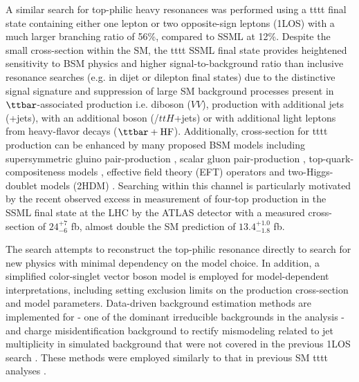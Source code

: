 \documentclass[../thesis.tex]{subfiles}
\begin{document}
A similar search for top-philic heavy resonances was performed using a \acs{tttt} final state containing either one lepton or two opposite-sign leptons (\acs{1LOS}) \citep{theory:ttZp_1los} with a much larger branching ratio of 56\%, compared to \acs{SSML} at 12\%. Despite the small cross-section within the \acs{SM}, the \acs{tttt} \acs{SSML} final state provides heightened sensitivity to \acs{BSM} physics and higher signal-to-background ratio than inclusive resonance searches (e.g. in dijet or dilepton final states) due to the distinctive signal signature and suppression of large \acs{SM} background processes present in $\ttbar$-associated production i.e. diboson ($VV$), \ttbar production with additional jets (\ttbar+jets), with an additional boson (\ttV/$ttH$+jets) or with additional light leptons from heavy-flavor decays ($\ttbar+\text{HF}$). Additionally, cross-section for \acs{tttt} production can be enhanced by many proposed \acs{BSM} models including supersymmetric gluino pair-production \citep{Nilles:1983ge,Farrar:1978xj}, scalar gluon pair-production \citep{Plehn_2009,Calvet_2013}, top-quark-compositeness models \citep{Pomarol_2008,Kumar_2009}, effective field theory (\acs{EFT}) operators \citep{Banelli_2021,Aoude_2022,Zhang_2018,Degrande_2011,Darm__2021} and two-Higgs-doublet models (\acs{2HDM}) \citep{Craig:2015jba,Craig_2017,Branco:2011iw,PhysRevD.93.075038,higgscomp}. Searching within this channel is particularly motivated by the recent observed excess in measurement of four-top production in the \acs{SSML} final state at the \acs{LHC} by the \acs{ATLAS} detector \citep{tttt_obs} with a measured cross-section of $24^{+7}_{-6}$ fb, almost double the \acs{SM} prediction of $13.4^{+1.0}_{-1.8}$ fb.

The search attempts to reconstruct the top-philic resonance directly to search for new physics with minimal dependency on the model choice. In addition, a simplified color-singlet vector boson model \citep{theory:ttZp} is employed for model-dependent interpretations, including setting exclusion limits on the production cross-section and model parameters. Data-driven background estimation methods are implemented for \ttW - one of the dominant irreducible backgrounds in the analysis - and charge misidentification background to rectify mismodeling related to jet multiplicity in simulated background that were not covered in the previous \acs{1LOS} search \citep{theory:ttZp_1los}. These methods were employed similarly to that in previous \acs{SM} \acs{tttt} analyses \citep{tttt_evidence,tttt_obs}.
\end{document}
